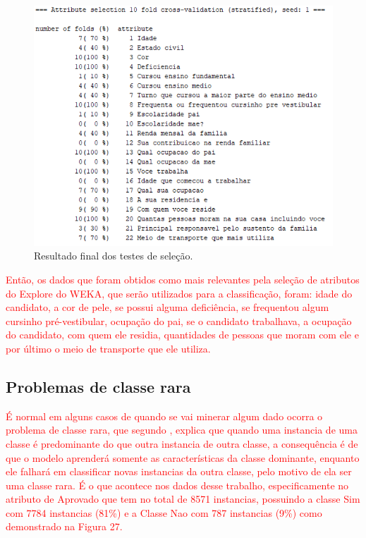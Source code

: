 \par
\begin{figure}[!htp]
	\begin{center}
    \caption{\label{fig:waveform_fig} Resultado final dos testes de seleção.}
	\includegraphics[scale=0.90]{Figuras/22_atributos.png}
	\end{center}
\end{figure}

\par
\textcolor{red}{Então, os dados que foram obtidos como mais relevantes pela seleção de atributos do Explore do WEKA, que serão utilizados para a classificação, foram: idade do candidato, a cor de pele, se possui alguma deficiência, se frequentou algum cursinho pré-vestibular, ocupação do pai, se o candidato trabalhava, a ocupação do candidato, com quem ele residia, quantidades de pessoas que moram com ele e por último o meio de transporte que ele utiliza.}

\subsection{Problemas de classe rara}

\par
\textcolor{red}{É normal em alguns casos de quando se vai minerar algum dado ocorra o problema de classe rara, que segundo , explica que quando uma instancia de uma classe é predominante do que outra instancia de outra classe, a consequência é de que o modelo aprenderá somente as características da classe dominante, enquanto ele falhará em classificar novas instancias da outra classe, pelo motivo de ela ser uma classe rara. É o que acontece nos dados desse trabalho, especificamente no atributo de Aprovado que tem no total de 8571 instancias, possuindo a classe Sim com 7784 instancias (81\%) e a Classe Nao com 787 instancias (9\%) como demonstrado na Figura 27.}

